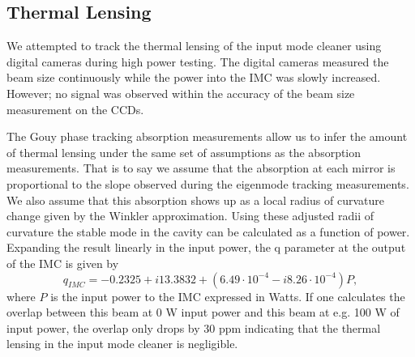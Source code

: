 \subsection{Thermal Lensing}
\label{sec:thermal_lensing}

We attempted to track the thermal lensing of the input mode cleaner using digital 
cameras during high power testing.  
The digital cameras measured the beam size continuously while the power into the 
IMC was slowly increased.  
However; no signal was observed within the accuracy of the beam size measurement on the CCDs.  

The Gouy phase tracking absorption measurements allow us to infer the amount of thermal 
lensing under the same set of assumptions as the absorption measurements.  
That is to say we assume that the absorption at each mirror is proportional to the slope 
observed during the eigenmode tracking measurements.  
We also assume that this absorption shows up as a local radius of curvature change 
given by the Winkler approximation.  
Using these adjusted radii of curvature the stable mode in the cavity can be calculated 
as a function of power.  
Expanding the result linearly in the input power, the q parameter at the 
output of the IMC is given by 
\begin{equation}
	q_{IMC}=-0.2325+i13.3832+(6.49\cdot10^{-4}-i8.26\cdot10^{-4})P,
\end{equation}	
where $P$ is the input power to the IMC expressed in Watts.  
If one calculates the overlap between this beam at 0 W input power and 
this beam at e.g. 100 W of input power, the overlap only drops by 30 ppm indicating that 
the thermal lensing in the input mode cleaner is negligible.  

